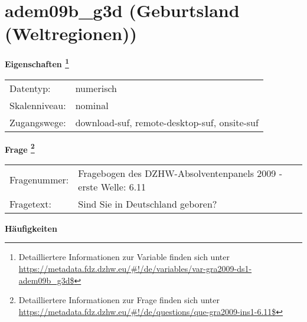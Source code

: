 
    \setcounter{footnote}{0}

    \vspace*{-1.8cm}
	\section{adem09b\_g3d (Geburtsland (Weltregionen))}
	\label{section:adem09b_g3d}



    \vspace*{0.5cm}
    \noindent\textbf{Eigenschaften
	\footnote{Detailliertere Informationen zur Variable finden sich unter
		\url{https://metadata.fdz.dzhw.eu/\#!/de/variables/var-gra2009-ds1-adem09b_g3d$}}}\\
	\begin{tabularx}{\hsize}{@{}lX}
	Datentyp: & numerisch \\
	Skalenniveau: & nominal \\
	Zugangswege: &
	  download-suf, 
	  remote-desktop-suf, 
	  onsite-suf
 \\
    \end{tabularx}



				\vspace*{0.5cm}
                \noindent\textbf{Frage
	                \footnote{Detailliertere Informationen zur Frage finden sich unter
		              \url{https://metadata.fdz.dzhw.eu/\#!/de/questions/que-gra2009-ins1-6.11$}}}\\
				\begin{tabularx}{\hsize}{@{}lX}
					Fragenummer: &
					  Fragebogen des DZHW-Absolventenpanels 2009 - erste Welle:
					  6.11
 \\
					Fragetext: & Sind Sie in Deutschland geboren? \\
				\end{tabularx}





        		\vspace*{0.5cm}
                \noindent\textbf{Häufigkeiten}

